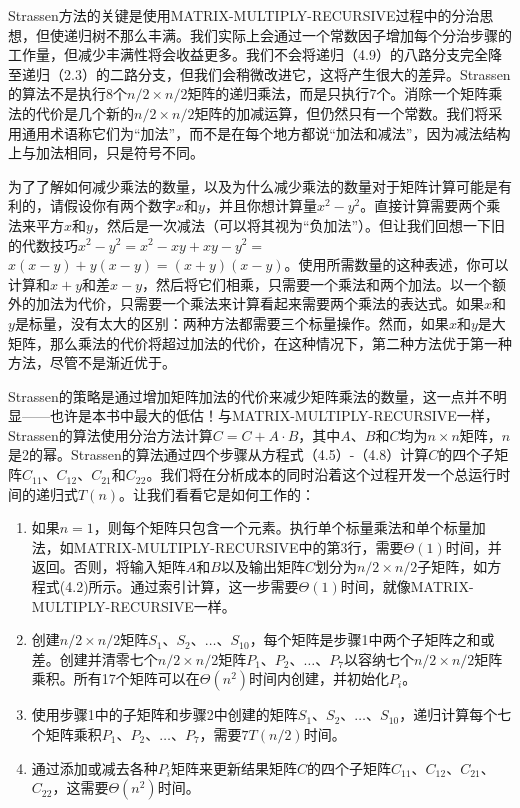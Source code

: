 \documentclass[lang=cn,newtx,10pt,scheme=chinese]{elegantbook}
\begin{document}
Strassen方法的关键是使用MATRIX-MULTIPLY-RECURSIVE过程中的分治思想，但使递归树不那么丰满。我们实际上会通过一个常数因子增加每个分治步骤的工作量，但减少丰满性将会收益更多。我们不会将递归（4.9）的八路分支完全降至递归（2.3）的二路分支，但我们会稍微改进它，这将产生很大的差异。Strassen的算法不是执行$8$个$n / 2 \times n / 2$矩阵的递归乘法，而是只执行$7$个。消除一个矩阵乘法的代价是几个新的$n / 2 \times n / 2$矩阵的加减运算，但仍然只有一个常数。我们将采用通用术语称它们为``加法''，而不是在每个地方都说``加法和减法''，因为减法结构上与加法相同，只是符号不同。

为了了解如何减少乘法的数量，以及为什么减少乘法的数量对于矩阵计算可能是有利的，请假设你有两个数字$x$和$y$，并且你想计算量$x^2-y^2$。直接计算需要两个乘法来平方$x$和$y$，然后是一次减法（可以将其视为“负加法”）。但让我们回想一下旧的代数技巧$x^2-y^2=x^2-x y+x y-y^2=$ $x(x-y)+y(x-y)=(x+y)(x-y)$。使用所需数量的这种表述，你可以计算和$x+y$和差$x-y$，然后将它们相乘，只需要一个乘法和两个加法。以一个额外的加法为代价，只需要一个乘法来计算看起来需要两个乘法的表达式。如果$x$和$y$是标量，没有太大的区别：两种方法都需要三个标量操作。然而，如果$x$和$y$是大矩阵，那么乘法的代价将超过加法的代价，在这种情况下，第二种方法优于第一种方法，尽管不是渐近优于。

Strassen的策略是通过增加矩阵加法的代价来减少矩阵乘法的数量，这一点并不明显——也许是本书中最大的低估！与MATRIX-MULTIPLY-RECURSIVE一样，Strassen的算法使用分治方法计算$C=C+A \cdot B$，其中$A、B$和$C$均为$n \times n$矩阵，$n$是2的幂。Strassen的算法通过四个步骤从方程式（4.5）-（4.8）计算$C$的四个子矩阵$C_{11}$、$C_{12}$、$C_{21}$和$C_{22}$。我们将在分析成本的同时沿着这个过程开发一个总运行时间的递归式$T(n)$。让我们看看它是如何工作的：

\begin{enumerate}
\item 如果$n=1$，则每个矩阵只包含一个元素。执行单个标量乘法和单个标量加法，如MATRIX-MULTIPLY-RECURSIVE中的第3行，需要$\Theta(1)$时间，并返回。否则，将输入矩阵$A$和$B$以及输出矩阵$C$划分为$n/2\times n/2$子矩阵，如方程式(4.2)所示。通过索引计算，这一步需要$\Theta(1)$时间，就像MATRIX-MULTIPLY-RECURSIVE一样。
\item 创建$n/2\times n/2$矩阵$S_1$、$S_2$、$\ldots$、$S_{10}$，每个矩阵是步骤1中两个子矩阵之和或差。创建并清零七个$n/2\times n/2$矩阵$P_1、P_2、\ldots、P_7$以容纳七个$n/2\times n/2$矩阵乘积。所有17个矩阵可以在$\Theta(n^2)$时间内创建，并初始化$P_i$。
\item 使用步骤1中的子矩阵和步骤2中创建的矩阵$S_1$、$S_2$、$\ldots$、$S_{10}$，递归计算每个七个矩阵乘积$P_1$、$P_2$、$\ldots$、$P_7$，需要$7T(n/2)$时间。
\item 通过添加或减去各种$P_i$矩阵来更新结果矩阵$C$的四个子矩阵$C_{11}$、$C_{12}$、$C_{21}$、$C_{22}$，这需要$\Theta(n^2)$时间。
\end{enumerate}
\end{document}
